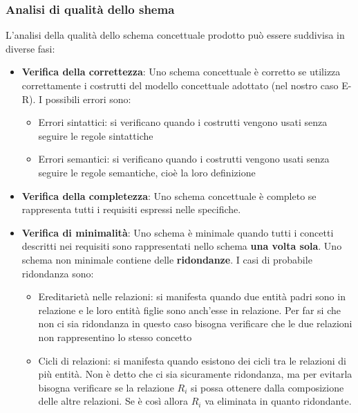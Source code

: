 \documentclass[a4paper,twoside]{article}
\begin{document}
\subsubsection{Analisi di qualità dello shema}
L'analisi della qualità dello schema concettuale prodotto può essere suddivisa in diverse
fasi:
\begin{itemize}
  \item \textbf{Verifica della correttezza}: Uno schema concettuale è corretto se utilizza
    correttamente i costrutti del modello concettuale adottato (nel nostro caso E-R).
    I possibili errori sono:
    \begin{itemize}
      \item Errori sintattici: si verificano quando i costrutti vengono usati senza seguire
        le regole sintattiche
      \item Errori semantici: si verificano quando i costrutti vengono usati senza seguire
        le regole semantiche, cioè la loro definizione
    \end{itemize}

  \item \textbf{Verifica della completezza}: Uno schema concettuale è completo se
    rappresenta tutti i requisiti espressi nelle specifiche.

  \item \textbf{Verifica di minimalità}: Uno schema è minimale quando tutti i concetti
    descritti nei requisiti sono rappresentati nello schema \textbf{una volta sola}.
    Uno schema non minimale contiene delle \textbf{ridondanze}. I casi di probabile
    ridondanza sono:
    \begin{itemize}
      \item Ereditarietà nelle relazioni: si manifesta quando due 
        entità padri sono in relazione e le loro entità figlie sono anch'esse in relazione.
        Per far si che non ci sia ridondanza in questo caso bisogna verificare che le 
        due relazioni non rappresentino lo stesso concetto

      \item Cicli di relazioni: si manifesta quando esistono dei cicli tra le relazioni
        di più entità. Non è detto che ci sia sicuramente ridondanza, ma per evitarla
        bisogna verificare se la relazione \( R_i \) si possa ottenere dalla composizione
        delle altre relazioni. Se è così allora \( R_i \) va eliminata in quanto ridondante.
    \end{itemize}


\end{itemize}
\end{document}

